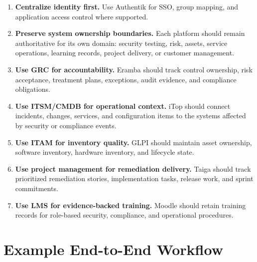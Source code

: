 \documentclass[10pt,letterpaper]{article}
\begin{document}
\begin{enumerate}
  \item \textbf{Centralize identity first.} Use Authentik for SSO, group mapping, and application access control where supported.
  \item \textbf{Preserve system ownership boundaries.} Each platform should remain authoritative for its own domain: security testing, risk, assets, service operations, learning records, project delivery, or customer management.
  \item \textbf{Use GRC for accountability.} Eramba should track control ownership, risk acceptance, treatment plans, exceptions, audit evidence, and compliance obligations.
  \item \textbf{Use ITSM/CMDB for operational context.} iTop should connect incidents, changes, services, and configuration items to the systems affected by security or compliance events.
  \item \textbf{Use ITAM for inventory quality.} GLPI should maintain asset ownership, software inventory, hardware inventory, and lifecycle state.
  \item \textbf{Use project management for remediation delivery.} Taiga should track prioritized remediation stories, implementation tasks, release work, and sprint commitments.
  \item \textbf{Use LMS for evidence-backed training.} Moodle should retain training records for role-based security, compliance, and operational procedures.
\end{enumerate}

\section{Example End-to-End Workflow}
\end{document}
